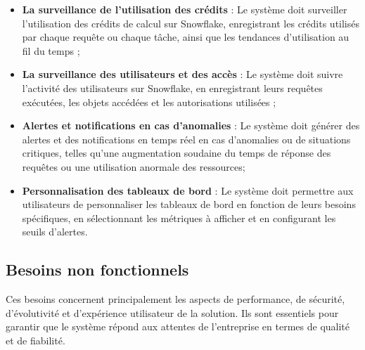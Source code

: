 \begin{itemize}
            \item \textbf{La surveillance de l'utilisation des crédits} :
            Le système doit surveiller l'utilisation des crédits de calcul sur Snowflake, enregistrant les crédits utilisés par chaque requête ou chaque tâche, ainsi que les tendances d'utilisation au fil du temps ;
            
            \item \textbf{La surveillance des utilisateurs et des accès} :
            Le système doit suivre l'activité des utilisateurs sur Snowflake, en enregistrant leurs requêtes exécutées, les objets accédées et les autorisations utilisées ;
            
            \item \textbf{Alertes et notifications en cas d'anomalies} :
            Le système doit générer des alertes et des notifications en temps réel en cas d'anomalies ou de situations critiques, telles qu'une augmentation soudaine du temps de réponse des requêtes ou une utilisation anormale des ressources; 
            
            \item \textbf{Personnalisation des tableaux de bord} :
            Le système doit permettre aux utilisateurs de personnaliser les tableaux de bord en fonction de leurs besoins spécifiques, en sélectionnant les métriques à afficher et en configurant les seuils d'alertes.
        \end{itemize}        
    \subsection{Besoins non fonctionnels}
  \par Ces besoins concernent principalement les aspects de performance, de sécurité, d'évolutivité et d'expérience utilisateur de la solution. 
  Ils sont essentiels pour garantir que le système répond aux attentes de l'entreprise en termes de qualité et de fiabilité.

